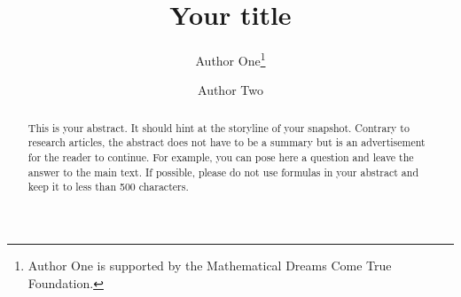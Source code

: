 \documentclass{snapshotmfo}
\author{Author One\thanks{Author One is supported by the Mathematical Dreams Come True Foundation.} \and Author Two}
\title{Your title}
\begin{document}

\begin{abstract}
This is your abstract. It should hint at the storyline of your snapshot. Contrary to research articles, the abstract does not have to be a summary but is an advertisement for the reader to continue. For example, you can pose here a question and leave the answer to the main text. If possible, please do not use formulas in your abstract and keep it to less than 500 characters.
\end{abstract}
\end{document}
